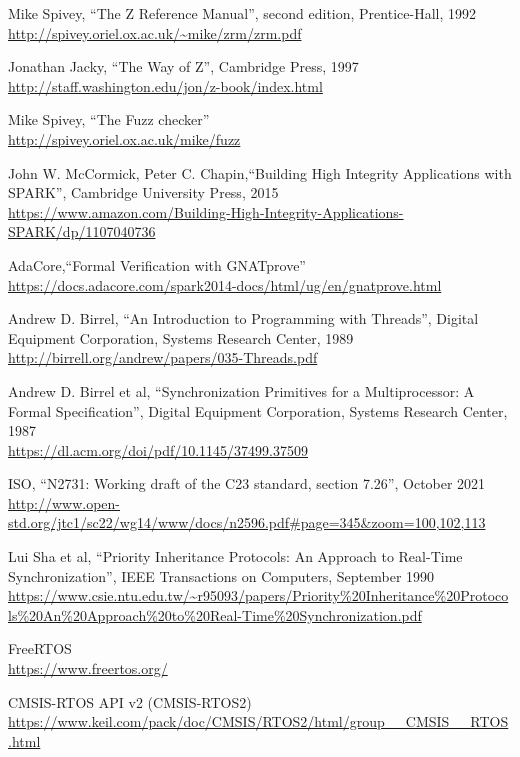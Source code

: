 \documentclass[11pt,letterpaper,twoside,openany]{book}
\begin{document}
\begin{thebibliography}{9}

Mike Spivey, ``The Z Reference Manual'', second edition, Prentice-Hall, 1992 \\
\url{http://spivey.oriel.ox.ac.uk/~mike/zrm/zrm.pdf}

Jonathan Jacky, ``The Way of Z'', Cambridge Press, 1997 \\
\url{http://staff.washington.edu/jon/z-book/index.html}

Mike Spivey, ``The Fuzz checker'' \\
\url{http://spivey.oriel.ox.ac.uk/mike/fuzz}

John W. McCormick, Peter C. Chapin,``Building High Integrity Applications with SPARK'', Cambridge University Press, 2015 \\
\url{https://www.amazon.com/Building-High-Integrity-Applications-SPARK/dp/1107040736}

AdaCore,``Formal Verification with GNATprove'' \\
\url{https://docs.adacore.com/spark2014-docs/html/ug/en/gnatprove.html}

Andrew D. Birrel, ``An Introduction to Programming with Threads'',
Digital Equipment Corporation, Systems Research Center, 1989 \\
\url{http://birrell.org/andrew/papers/035-Threads.pdf}

Andrew D. Birrel et al, ``Synchronization Primitives for a Multiprocessor: A Formal Specification'',
Digital Equipment Corporation, Systems Research Center, 1987 \\
\url{https://dl.acm.org/doi/pdf/10.1145/37499.37509}

ISO, ``N2731: Working draft of the C23 standard, section 7.26'', October 2021 \\
\url{http://www.open-std.org/jtc1/sc22/wg14/www/docs/n2596.pdf#page=345&zoom=100,102,113}

Lui Sha et al, ``Priority Inheritance Protocols: An Approach to Real-Time Synchronization'', IEEE Transactions on Computers, September 1990 \\
\url{https://www.csie.ntu.edu.tw/~r95093/papers/Priority%20Inheritance%20Protocols%20An%20Approach%20to%20Real-Time%20Synchronization.pdf}

FreeRTOS \\
\url{https://www.freertos.org/}

CMSIS-RTOS API v2 (CMSIS-RTOS2) \\
\url{https://www.keil.com/pack/doc/CMSIS/RTOS2/html/group__CMSIS__RTOS.html}

\end{thebibliography}
\end{document}
